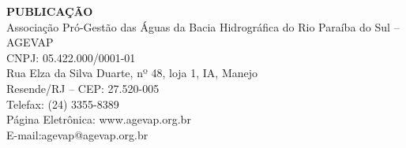 \pagebreak

\vspace*{\fill}%
\raggedright
{\textbf{PUBLICAÇÃO\\}
\vspace{2em}
Associação Pró-Gestão das Águas da Bacia Hidrográfica do Rio Paraíba do Sul – AGEVAP\\
CNPJ: 05.422.000/0001-01\\
Rua Elza da Silva Duarte, nº 48, loja 1, IA, Manejo\\
Resende/RJ – CEP: 27.520-005\\
Telefax: (24) 3355-8389\\
Página Eletrônica: www.agevap.org.br\\
E-mail:agevap@agevap.org.br}

\pagebreak

\clearpage